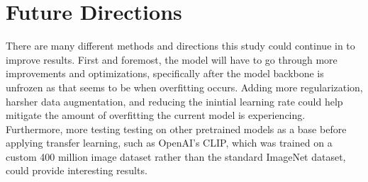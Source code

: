 \documentclass{article}
\begin{document}
\section{Future Directions}
There are many different methods and directions this study could continue in to improve results. First and foremost, the model will have to go through more improvements and optimizations, specifically after the model backbone is unfrozen as that seems to be when overfitting occurs. Adding more regularization, harsher data augmentation, and reducing the inintial learning rate could help mitigate the amount of overfitting the current model is experiencing. Furthermore, more testing testing on other pretrained models as a base before applying transfer learning, such as OpenAI's CLIP, which was trained on a custom 400 million image dataset rather than the standard ImageNet dataset, could provide interesting results.
\end{document}
